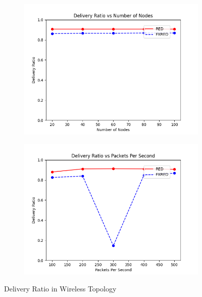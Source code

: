 \documentclass[10pt]{report}
\begin{document}
\begin{figure}
\begin{subfigure}{.5\textwidth}
        \includegraphics[width=1\linewidth]{static/graphs/wireless/Delivery Ratio vs Number of Nodes.png}
    \end{subfigure}%
    \begin{subfigure}{.5\textwidth}
        \includegraphics[width=1\linewidth]{static/graphs/wireless/Delivery Ratio vs Packets Per Second.png}
    \end{subfigure}
    \caption{Delivery Ratio in Wireless Topology}
    \label{fig:wireless_del_ratio}
\end{figure}
\end{document}
